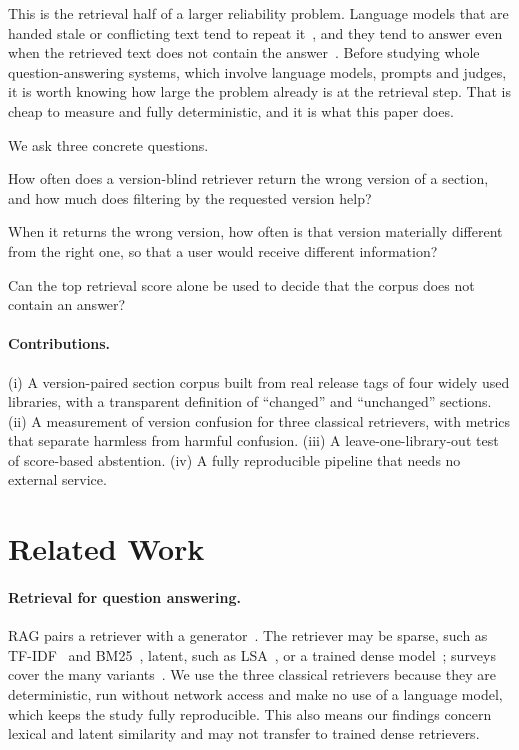 \documentclass[11pt,a4paper]{article}
\begin{document}
This is the retrieval half of a larger reliability problem. Language models that are handed stale or conflicting
text tend to repeat it~\cite{xu2024conflicts,ji2023hallucination}, and they tend to answer even when the retrieved text does
not contain the answer~\cite{chen2024rgb}. Before studying whole question-answering systems, which involve language models,
prompts and judges, it is worth knowing how large the problem already is at the retrieval step. That is
cheap to measure and fully deterministic, and it is what this paper does.

We ask three concrete questions.
\begin{description}\setlength{\itemsep}{1pt}
\item[RQ1 (outdated documents).] How often does a version-blind retriever return the wrong version of a section, and how much does
filtering by the requested version help?
\item[RQ2 (conflicting sources).] When it returns the wrong version, how often is that version materially different from
the right one, so that a user would receive different information?
\item[RQ3 (insufficient evidence).] Can the top retrieval score alone be used to decide that the corpus does not contain an answer?
\end{description}

\paragraph{Contributions.} (i) A version-paired section corpus built from real release tags of four widely used
libraries, with a transparent definition of ``changed'' and ``unchanged'' sections. (ii) A measurement of version
confusion for three classical retrievers, with metrics that separate harmless from harmful confusion. (iii) A
leave-one-library-out test of score-based abstention. (iv) A fully reproducible pipeline that needs no external
service.

\section{Related Work}
\paragraph{Retrieval for question answering.}
RAG pairs a retriever with a generator~\cite{lewis2020rag}. The retriever may be sparse, such as TF-IDF~\cite{salton1988tfidf} and
BM25~\cite{robertson2009bm25}, latent, such as LSA~\cite{deerwester1990lsa}, or a trained dense model~\cite{karpukhin2020dpr}; surveys
cover the many variants~\cite{gao2023ragsurvey}. We use the three classical retrievers because they are deterministic, run without
network access and make no use of a language model, which keeps the study fully reproducible. This also means our
findings concern lexical and latent similarity and may not transfer to trained dense retrievers.
\end{document}
